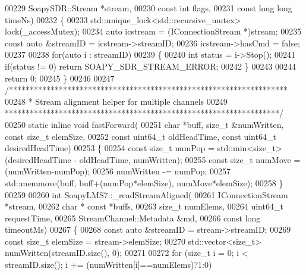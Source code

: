 \begin{DoxyCode}
00229     SoapySDR::Stream *stream,
00230     \textcolor{keyword}{const} \textcolor{keywordtype}{int} flags,
00231     \textcolor{keyword}{const} \textcolor{keywordtype}{long} \textcolor{keywordtype}{long} timeNs)
00232 \{
00233     std::unique\_lock<std::recursive\_mutex> lock(\_accessMutex);
00234     \textcolor{keyword}{auto} icstream = (IConnectionStream *)stream;
00235     \textcolor{keyword}{const} \textcolor{keyword}{auto} &streamID = icstream->streamID;
00236     icstream->hasCmd = \textcolor{keyword}{false};
00237 
00238     \textcolor{keywordflow}{for}(\textcolor{keyword}{auto} i : streamID)
00239     \{
00240         \textcolor{keywordtype}{int} status = i->Stop();
00241         \textcolor{keywordflow}{if}(status != 0) \textcolor{keywordflow}{return} SOAPY_SDR_STREAM_ERROR;
00242     \}
00243 
00244     \textcolor{keywordflow}{return} 0;
00245 \}
00246 
00247 \textcolor{comment}{/*******************************************************************}
00248 \textcolor{comment}{ * Stream alignment helper for multiple channels}
00249 \textcolor{comment}{ ******************************************************************/}
00250 \textcolor{keyword}{static} \textcolor{keyword}{inline} \textcolor{keywordtype}{void} fastForward(
00251     \textcolor{keywordtype}{char} *buff, \textcolor{keywordtype}{size\_t} &numWritten, \textcolor{keyword}{const} \textcolor{keywordtype}{size\_t} elemSize,
00252     \textcolor{keyword}{const} uint64\_t oldHeadTime, \textcolor{keyword}{const} uint64\_t desiredHeadTime)
00253 \{
00254     \textcolor{keyword}{const} \textcolor{keywordtype}{size\_t} numPop = std::min<size\_t>(desiredHeadTime - oldHeadTime, numWritten);
00255     \textcolor{keyword}{const} \textcolor{keywordtype}{size\_t} numMove = (numWritten-numPop);
00256     numWritten -= numPop;
00257     std::memmove(buff, buff+(numPop*elemSize), numMove*elemSize);
00258 \}
00259 
00260 \textcolor{keywordtype}{int} SoapyLMS7::_readStreamAligned(
00261     IConnectionStream *stream,
00262     \textcolor{keywordtype}{char} * \textcolor{keyword}{const} *buffs,
00263     \textcolor{keywordtype}{size\_t} numElems,
00264     uint64\_t requestTime,
00265     StreamChannel::Metadata &md,
00266     \textcolor{keyword}{const} \textcolor{keywordtype}{long} timeoutMs)
00267 \{
00268     \textcolor{keyword}{const} \textcolor{keyword}{auto} &streamID = stream->streamID;
00269     \textcolor{keyword}{const} \textcolor{keywordtype}{size\_t} elemSize = stream->elemSize;
00270     std::vector<size\_t> numWritten(streamID.size(), 0);
00271 
00272     \textcolor{keywordflow}{for} (\textcolor{keywordtype}{size\_t} i = 0; i < streamID.size(); i += (numWritten[i]==numElems)?1:0)

\end{DoxyCode}
